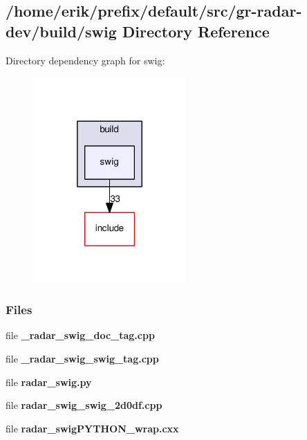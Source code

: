 \subsection{/home/erik/prefix/default/src/gr-\/radar-\/dev/build/swig Directory Reference}
\label{dir_ac6fa0b209be9d68cde2791b8a792f1d}
Directory dependency graph for swig\+:
\nopagebreak
\begin{figure}[H]
\begin{center}
\leavevmode
\includegraphics[width=166pt]{dir_ac6fa0b209be9d68cde2791b8a792f1d_dep}
\end{center}
\end{figure}
\subsubsection*{Files}
\begin{DoxyCompactItemize}
\item 
file {\bf \+\_\+radar\+\_\+swig\+\_\+doc\+\_\+tag.\+cpp}
\item 
file {\bf \+\_\+radar\+\_\+swig\+\_\+swig\+\_\+tag.\+cpp}
\item 
file {\bf radar\+\_\+swig.\+py}
\item 
file {\bf radar\+\_\+swig\+\_\+swig\+\_\+2d0df.\+cpp}
\item 
file {\bf radar\+\_\+swig\+P\+Y\+T\+H\+O\+N\+\_\+wrap.\+cxx}
\end{DoxyCompactItemize}
